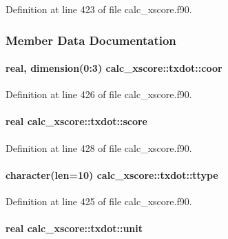 Definition at line 423 of file calc\-\_\-xscore.\-f90.



\subsubsection{Member Data Documentation}
\hypertarget{structcalc__xscore_1_1txdot_a95e430e8a8bdfdb589d35eea59fa8275}{
\paragraph[{coor}]{\setlength{\rightskip}{0pt plus 5cm}real, dimension(0\-:3) calc\-\_\-xscore\-::txdot\-::coor}}\label{structcalc__xscore_1_1txdot_a95e430e8a8bdfdb589d35eea59fa8275}


Definition at line 426 of file calc\-\_\-xscore.\-f90.

\hypertarget{structcalc__xscore_1_1txdot_ad8f8740d2b25f6f1e31b78a5ddf7072e}{
\paragraph[{score}]{\setlength{\rightskip}{0pt plus 5cm}real calc\-\_\-xscore\-::txdot\-::score}}\label{structcalc__xscore_1_1txdot_ad8f8740d2b25f6f1e31b78a5ddf7072e}


Definition at line 428 of file calc\-\_\-xscore.\-f90.

\hypertarget{structcalc__xscore_1_1txdot_a81545718f5265361d6e7bffebfc1ada7}{
\paragraph[{ttype}]{\setlength{\rightskip}{0pt plus 5cm}character(len=10) calc\-\_\-xscore\-::txdot\-::ttype}}\label{structcalc__xscore_1_1txdot_a81545718f5265361d6e7bffebfc1ada7}


Definition at line 425 of file calc\-\_\-xscore.\-f90.

\hypertarget{structcalc__xscore_1_1txdot_acf6c61fd8f3ee95d0c7a507530da4ce1}{
\paragraph[{unit}]{\setlength{\rightskip}{0pt plus 5cm}real calc\-\_\-xscore\-::txdot\-::unit}}\label{structcalc__xscore_1_1txdot_acf6c61fd8f3ee95d0c7a507530da4ce1}


